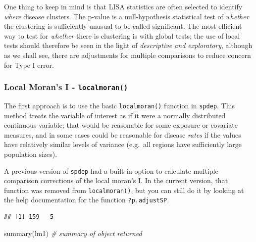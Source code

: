\documentclass[
]{book}
\newenvironment{Shaded}{\begin{snugshade}}{\end{snugshade}}
\newcommand{\AttributeTok}[1]{\textcolor[rgb]{0.77,0.63,0.00}{#1}}
\newcommand{\CommentTok}[1]{\textcolor[rgb]{0.56,0.35,0.01}{\textit{#1}}}
\newcommand{\FunctionTok}[1]{\textcolor[rgb]{0.00,0.00,0.00}{#1}}
\newcommand{\NormalTok}[1]{#1}
\newcommand{\OtherTok}[1]{\textcolor[rgb]{0.56,0.35,0.01}{#1}}
\newcommand{\SpecialCharTok}[1]{\textcolor[rgb]{0.00,0.00,0.00}{#1}}
\begin{document}
One thing to keep in mind is that LISA statistics are often selected to identify \emph{where} disease clusters. The p-value is a null-hypothesis statistical test of \emph{whether} the clustering is sufficiently unusual to be called significant. The most efficient way to test for \emph{whether} there is clustering is with global tests; the use of local tests should therefore be seen in the light of \emph{descriptive and exploratory}, although as we shall see, there are adjustments for multiple comparisons to reduce concern for Type I error.

\hypertarget{local-morans-i---localmoran}{%
\subsubsection{\texorpdfstring{Local Moran's I - \texttt{localmoran()}}{Local Moran's I - localmoran()}}\label{local-morans-i---localmoran}}

The first approach is to use the basic \texttt{localmoran()} function in \texttt{spdep}. This method treats the variable of interest as if it were a normally distributed continuous variable; that would be reasonable for some exposure or covariate measures, and in some cases could be reasonable for disease \emph{rates} if the values have relatively similar levels of variance (e.g.~all regions have sufficiently large population sizes).

A previous version of \texttt{spdep} had a built-in option to calculate multiple comparison corrections of the local moran's I. In the current version, that function was removed from \texttt{localmoran()}, but you can still do it by looking at the help documentation for the function \texttt{?p.adjustSP}.

\begin{Shaded}
\end{Shaded}

\begin{verbatim}
## [1] 159   5
\end{verbatim}

\begin{Shaded}
\begin{Highlighting}[]
\FunctionTok{summary}\NormalTok{(lm1)  }\CommentTok{\# summary of object returned}
\end{Highlighting}
\end{Shaded}
\end{document}
